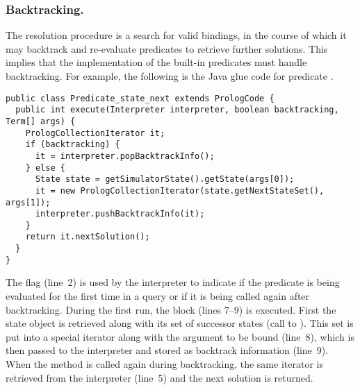 \subsubsection{Backtracking.} The \Prolog resolution procedure is a search for
valid bindings, in the course of which it may backtrack and re-evaluate
predicates to retrieve further solutions. This implies that the implementation of
the built-in predicates must handle backtracking. For example, the following is
the Java glue code for predicate .
%
\begin{lstlisting}[style=java]
public class Predicate_state_next extends PrologCode {
  public int execute(Interpreter interpreter, boolean backtracking, Term[] args) {
    PrologCollectionIterator it;
    if (backtracking) {
      it = interpreter.popBacktrackInfo();
    } else {
      State state = getSimulatorState().getState(args[0]);
      it = new PrologCollectionIterator(state.getNextStateSet(), args[1]);
      interpreter.pushBacktrackInfo(it);
    }
    return it.nextSolution();
  }
}
\end{lstlisting}
%
The  flag (line~2) is used by the interpreter to indicate
if the predicate is being evaluated for the first time in a query or if it is
being called again after backtracking. During the first run, the 
block (lines 7--9) is executed. First the state object is retrieved along with
its set of successor states (call to ). This
set is put into a special iterator along with the argument to be bound
(line~8), which is then passed to the interpreter and stored as backtrack
information (line~9). When the method is called again during backtracking, the
same iterator is retrieved from the interpreter (line~5) and the next solution
is returned.

%
%
